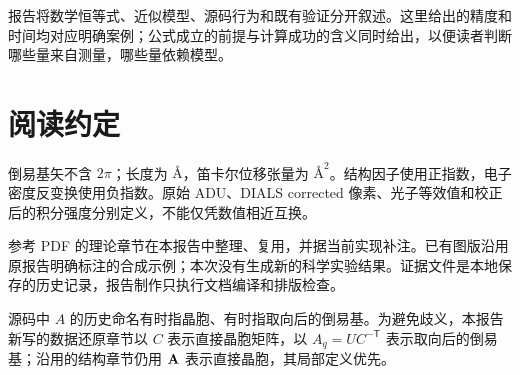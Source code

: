 \documentclass[UTF8,11pt,a4paper,oneside,openany,fontset=fandol]{ctexbook}
\newcommand{\angstrom}{\text{\AA}}\newcommand{\code}[1]{{\small\nolinkurl{#1}}}
\begin{document}
报告将数学恒等式、近似模型、源码行为和既有验证分开叙述。这里给出的精度和时间均对应明确案例；公式成立的前提与计算成功的含义同时给出，以便读者判断哪些量来自测量，哪些量依赖模型。
\chapter*{阅读约定}
倒易基矢不含 $2\pi$；长度为 $\angstrom$，笛卡尔位移张量为 $\angstrom^2$。结构因子使用正指数，电子密度反变换使用负指数。原始 ADU、DIALS corrected 像素、光子等效值和校正后的积分强度分别定义，不能仅凭数值相近互换。

参考 PDF 的理论章节在本报告中整理、复用，并据当前实现补注。已有图版沿用原报告明确标注的合成示例；本次没有生成新的科学实验结果。证据文件是本地保存的历史记录，报告制作只执行文档编译和排版检查。

源码中 $A$ 的历史命名有时指晶胞、有时指取向后的倒易基。为避免歧义，本报告新写的数据还原章节以 $C$ 表示直接晶胞矩阵，以 $A_q=UC^{-\mathsf T}$ 表示取向后的倒易基；沿用的结构章节仍用 $\mathbf{A}$ 表示直接晶胞，其局部定义优先。
\tableofcontents
\end{document}
